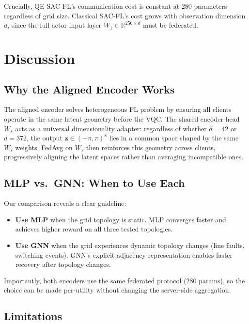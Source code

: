 \documentclass[journal]{IEEEtran}
\begin{document}
Crucially, QE-SAC-FL's communication cost is constant at 280 parameters
regardless of grid size. Classical SAC-FL's cost grows with observation
dimension $d$, since the full actor input layer $W_1 \in \mathbb{R}^{256 \times d}$
must be federated.

\section{Discussion}
\label{sec:discussion}

\subsection{Why the Aligned Encoder Works}

The aligned encoder solves heterogeneous FL problem by ensuring all clients operate in the
same latent geometry before the VQC. The shared encoder head $W_s$
acts as a universal dimensionality adapter: regardless of whether
$d=42$ or $d=372$, the output $\mathbf{z} \in (-\pi,\pi)^8$ lies in
a common space shaped by the same $W_s$ weights. FedAvg on $W_s$ then
reinforces this geometry across clients, progressively aligning the
latent spaces rather than averaging incompatible ones.

\subsection{MLP vs.\ GNN: When to Use Each}

Our comparison reveals a clear guideline:
\begin{itemize}
    \item \textbf{Use MLP} when the grid topology is static. MLP converges
    faster and achieves higher reward on all three tested topologies.
    \item \textbf{Use GNN} when the grid experiences dynamic topology changes
    (line faults, switching events). GNN's explicit adjacency representation
    enables faster recovery after topology changes.
\end{itemize}
Importantly, both encoders use the same federated protocol (280 params),
so the choice can be made per-utility without changing the server-side
aggregation.

\subsection{Limitations}
\end{document}
